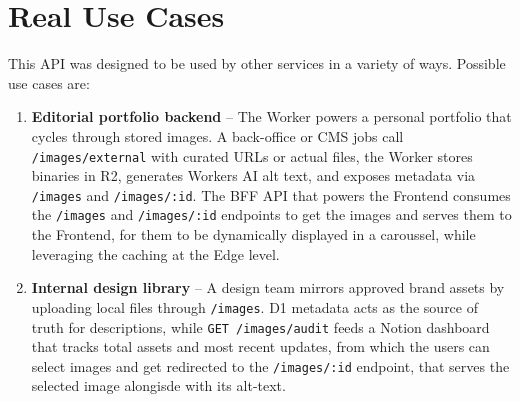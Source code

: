 \documentclass[12pt]{article}
\begin{document}
\section{Real Use Cases}
This API was designed to be used by other services in a variety of ways. Possible use cases are:
\begin{enumerate}[leftmargin=*]
  \item \textbf{Editorial portfolio backend} – The Worker powers a personal portfolio that cycles through stored images. A back-office or CMS jobs call \texttt{/images/external} with curated URLs or actual files, the Worker stores binaries in R2, generates Workers AI alt text, and exposes metadata via \texttt{/images} and \texttt{/images/:id}. The BFF API that powers the Frontend consumes the \texttt{/images} and \texttt{/images/:id} endpoints to get the images and serves them to the Frontend, for them to be dynamically displayed in a caroussel, while leveraging the caching at the Edge level.
  \item \textbf{Internal design library} – A design team mirrors approved brand assets by uploading local files through \texttt{/images}. D1 metadata acts as the source of truth for descriptions, while \texttt{GET /images/audit} feeds a Notion dashboard that tracks total assets and most recent updates, from which the users can select images and get redirected to the \texttt{/images/:id} endpoint, that serves the selected image alongisde with its alt-text.
\end{enumerate}
\end{document}
